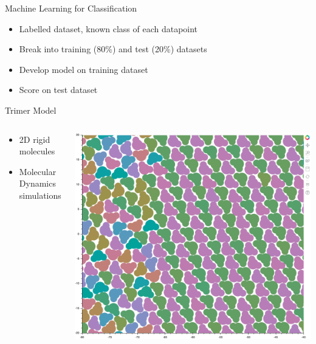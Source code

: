 \documentclass[aspectratio=169, 14pt]{beamer}
\begin{document}
\begin{frame}{Machine Learning for Classification}

  \begin{itemize}
    \item Labelled dataset, known class of each datapoint
    \item Break into training (80\%) and test (20\%) datasets
    \item Develop model on training dataset
    \item Score on test dataset
  \end{itemize}

\end{frame}

\begin{frame}{Trimer Model}

  \begin{columns}
    \begin{column}{0.4\textwidth}
      \begin{itemize}
        \item 2D rigid molecules
        \item Molecular Dynamics simulations
      \end{itemize}
    \end{column}
    \begin{column}{0.6\textwidth}
      \includegraphics[width=\textwidth]{Trimer_snapshot.png}
    \end{column}
  \end{columns}
\end{frame}
\end{document}
